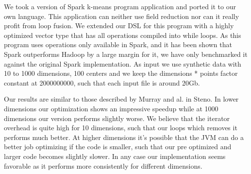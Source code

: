 We took a version of Spark k-means program  application and ported it to our own language. This application can neither use field reduction nor can it really profit from loop fusion. We extended our DSL for this program with a highly optimized vector type that has all operations compiled into while loops. As this program uses operations only available in Spark, and it has been shown that Spark outperforms Hadoop by a large margin for it, we have only benchmarked it against the original Spark implementation. As input we use synthetic data with 10 to 1000 dimensions, 100 centers and we keep the dimensions * points factor constant at 2000000000, such that each input file is around 20Gb. 

Our results are similar to those described by Murray and al. in Steno\cite{}. In lower dimensions our optimization shows an impressive speedup while at 1000 dimensions our version performs slightly worse. We believe that the iterator overhead is quite high for 10 dimensions, such that our loops which removes it performs much better. At higher dimensions it's possible that the JVM can do a better job optimizing if the code is smaller, such that our pre optimized and larger code becomes slightly slower. In any case our implementation seems favorable as it performs more consistently for different dimensions.
